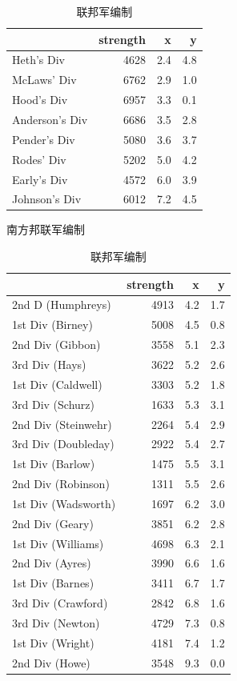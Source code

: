 \documentclass{article}
\begin{document}
\begin{table}
\parbox{.45\linewidth}{
\begin{tabular}{lrrr}
\toprule
{} &  strength &    x &    y \\
\midrule
Heth's Div     &      4628 &  2.4 &  4.8 \\
McLaws' Div    &      6762 &  2.9 &  1.0 \\
Hood's Div     &      6957 &  3.3 &  0.1 \\
Anderson's Div &      6686 &  3.5 &  2.8 \\
Pender's Div   &      5080 &  3.6 &  3.7 \\
Rodes' Div     &      5202 &  5.0 &  4.2 \\
Early's Div    &      4572 &  6.0 &  3.9 \\
Johnson's Div  &      6012 &  7.2 &  4.5 \\
\bottomrule
\end{tabular}
\caption{南方邦联军编制}
\label{tab:Confederate}
}
\hfill
\parbox{.45\linewidth}{
\begin{tabular}{lrrr}
\toprule
{} &  strength &    x &    y \\
\midrule
2nd D (Humphreys)   &      4913 &  4.2 &  1.7 \\
1st Div (Birney)    &      5008 &  4.5 &  0.8 \\
2nd Div (Gibbon)    &      3558 &  5.1 &  2.3 \\
3rd Div (Hays)      &      3622 &  5.2 &  2.6 \\
1st Div (Caldwell)  &      3303 &  5.2 &  1.8 \\
3rd Div (Schurz)    &      1633 &  5.3 &  3.1 \\
2nd Div (Steinwehr) &      2264 &  5.4 &  2.9 \\
3rd Div (Doubleday) &      2922 &  5.4 &  2.7 \\
1st Div (Barlow)    &      1475 &  5.5 &  3.1 \\
2nd Div (Robinson)  &      1311 &  5.5 &  2.6 \\
1st Div (Wadsworth) &      1697 &  6.2 &  3.0 \\
2nd Div (Geary)     &      3851 &  6.2 &  2.8 \\
1st Div (Williams)  &      4698 &  6.3 &  2.1 \\
2nd Div (Ayres)     &      3990 &  6.6 &  1.6 \\
1st Div (Barnes)    &      3411 &  6.7 &  1.7 \\
3rd Div (Crawford)  &      2842 &  6.8 &  1.6 \\
3rd Div (Newton)    &      4729 &  7.3 &  0.8 \\
1st Div (Wright)    &      4181 &  7.4 &  1.2 \\
2nd Div (Howe)      &      3548 &  9.3 &  0.0 \\
\bottomrule
\end{tabular}
\caption{联邦军编制}
\label{tab:Union}
}
\end{table}
\end{document}
